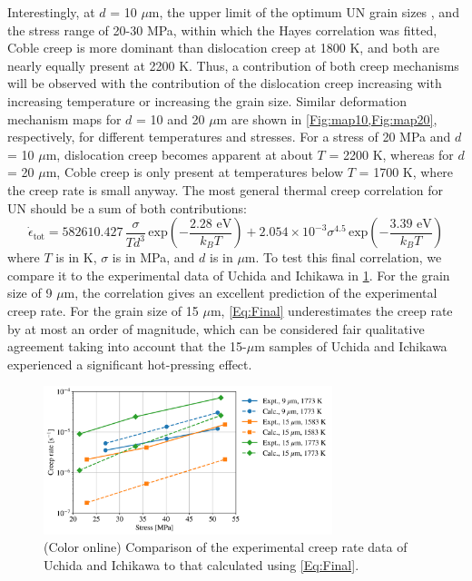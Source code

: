 \documentclass[preprint, 12pt]{elsarticle}
\newcommand{\?}{\stackrel{?}{=}}
\begin{document}
Interestingly, at $d$ = 10 $\mu$m, the upper limit of the optimum UN grain sizes \cite{Johnson2018}, and the stress range of 20-30 MPa, within which the Hayes correlation was fitted, Coble creep is more dominant than dislocation creep at 1800 K, and both are nearly equally present at 2200 K. Thus, a contribution of both creep mechanisms will be observed with the contribution of the dislocation creep increasing with increasing temperature or increasing the grain size. Similar deformation mechanism maps for $d$ = 10 and 20 $\mu$m are shown in \cref{Fig:map10,Fig:map20}, respectively, for different temperatures and stresses. For a stress of 20 MPa and $d$ = 10 $\mu$m, dislocation creep becomes apparent at about $T$ = 2200 K, whereas for $d$ = 20 $\mu$m, Coble creep is only present at temperatures below $T$ = 1700 K, where the creep rate is small anyway. The most general thermal creep correlation for UN should be a sum of both contributions:
\begin{equation}
    \Dot{\epsilon}_\mathrm{tot} = 582610.427 \, \frac{\sigma}{T d^3} \, \mathrm{exp} \! \left( - \frac{2.28 \text{ eV}}{k_B T} \right) + 2.054 \times 10^{-3} \sigma^{4.5} \, \mathrm{exp} \! \left( - \frac{3.39 \text{ eV}}{k_B T} \right)
    \label{Eq:Final}
\end{equation}
where $T$ is in K, $\sigma$ is in MPa, and $d$ is in $\mu$m. To test this final correlation, we compare it to the experimental data of Uchida and Ichikawa \cite{Uchida1973} in \cref{Fig:Final}. For the grain size of 9 $\mu$m, the correlation gives an excellent prediction of the experimental creep rate. For the grain size of 15 $\mu$m, \cref{Eq:Final} underestimates the creep rate by at most an order of magnitude, which can be considered fair qualitative agreement taking into account that the 15-$\mu$m samples of Uchida and Ichikawa \cite{Uchida1973} experienced a significant hot-pressing effect.



\begin{figure}[h!]
    \centering
    \includegraphics[width=0.75\textwidth]{Final.png}
    \caption{(Color online) Comparison of the experimental creep rate data of Uchida and Ichikawa \cite{Uchida1973} to that calculated using \cref{Eq:Final}.}
    \label{Fig:Final}
\end{figure}
\end{document}
